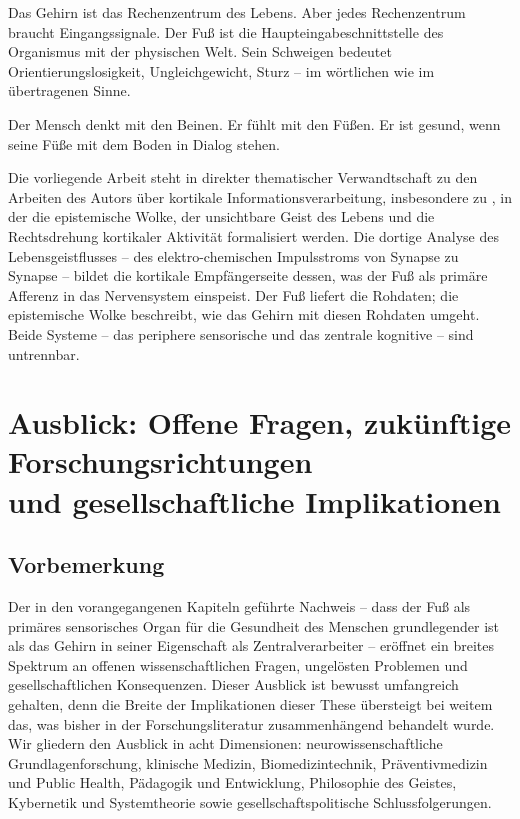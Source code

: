 ﻿\documentclass[12pt,a4paper]{report}
\theoremstyle{plain}
\theoremstyle{definition}
\theoremstyle{remark}
\begin{document}
Das Gehirn ist das Rechenzentrum des Lebens. Aber jedes Rechenzentrum
braucht Eingangssignale. Der Fuß ist die Haupteingabeschnittstelle
des Organismus mit der physischen Welt. Sein Schweigen bedeutet
Orientierungslosigkeit, Ungleichgewicht, Sturz -- im wörtlichen wie
im übertragenen Sinne.

Der Mensch denkt mit den Beinen. Er fühlt mit den Füßen. Er ist gesund,
wenn seine Füße mit dem Boden in Dialog stehen.

Die vorliegende Arbeit steht in direkter thematischer Verwandtschaft
zu den Arbeiten des Autors über kortikale Informationsverarbeitung,
insbesondere zu \cite{epp2026brn}, in der die epistemische Wolke,
der unsichtbare Geist des Lebens und die Rechtsdrehung kortikaler
Aktivität formalisiert werden. Die dortige Analyse des Lebensgeistflusses --
des elektro-chemischen Impulsstroms von Synapse zu Synapse -- bildet
die kortikale Empfängerseite dessen, was der Fuß als primäre Afferenz
in das Nervensystem einspeist. Der Fuß liefert die Rohdaten;
die epistemische Wolke beschreibt, wie das Gehirn mit diesen Rohdaten
umgeht. Beide Systeme -- das periphere sensorische und das zentrale
kognitive -- sind untrennbar.

\chapter{Ausblick: Offene Fragen, zukünftige Forschungsrichtungen\\
und gesellschaftliche Implikationen}

\section{Vorbemerkung}

Der in den vorangegangenen Kapiteln geführte Nachweis -- dass der Fuß
als primäres sensorisches Organ für die Gesundheit des Menschen
grundlegender ist als das Gehirn in seiner Eigenschaft als
Zentralverarbeiter -- eröffnet ein breites Spektrum an offenen
wissenschaftlichen Fragen, ungelösten Problemen und gesellschaftlichen
Konsequenzen. Dieser Ausblick ist bewusst umfangreich gehalten, denn
die Breite der Implikationen dieser These übersteigt bei weitem das,
was bisher in der Forschungsliteratur zusammenhängend behandelt wurde.
Wir gliedern den Ausblick in acht Dimensionen: neurowissenschaftliche
Grundlagenforschung, klinische Medizin, Biomedizintechnik,
Präventivmedizin und Public Health, Pädagogik und Entwicklung,
Philosophie des Geistes, Kybernetik und Systemtheorie sowie
gesellschaftspolitische Schlussfolgerungen.
\end{document}
